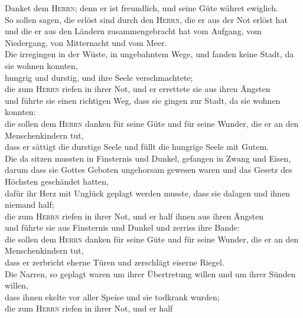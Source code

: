  Danket dem \textsc{Herrn}; denn er ist freundlich, und
seine Güte währet ewiglich.\\
 So sollen sagen, die erlöst sind durch den
\textsc{Herrn}, die er aus der Not erlöst hat\\
 und die er aus den Ländern zusammengebracht hat vom
Aufgang, vom Niedergang, von Mitternacht und vom Meer.\\
 Die irregingen in der Wüste, in ungebahntem Wege, und
fanden keine Stadt, da sie wohnen konnten,\\
 hungrig und durstig, und ihre Seele verschmachtete;\\
 die zum \textsc{Herrn} riefen in ihrer Not, und er
errettete sie aus ihren Ängsten\\
 und führte sie einen richtigen Weg, dass sie gingen zur
Stadt, da sie wohnen konnten:\\
 die sollen dem \textsc{Herrn} danken für seine Güte und
für seine Wunder, die er an den Menschenkindern tut,\\
 dass er sättigt die durstige Seele und füllt die hungrige
Seele mit Gutem.\\
 Die da sitzen mussten in Finsternis und Dunkel, gefangen
in Zwang und Eisen,\\
 darum dass sie Gottes Geboten ungehorsam gewesen waren
und das Gesetz des Höchsten geschändet hatten,\\
 dafür ihr Herz mit Unglück geplagt werden musste, dass
sie dalagen und ihnen niemand half;\\
 die zum \textsc{Herrn} riefen in ihrer Not, und er half
ihnen aus ihren Ängsten\\
 und führte sie aus Finsternis und Dunkel und zerriss
ihre Bande:\\
 die sollen dem \textsc{Herrn} danken für seine Güte und
für seine Wunder, die er an den Menschenkindern tut,\\
 dass er zerbricht eherne Türen und zerschlägt eiserne
Riegel.\\
 Die Narren, so geplagt waren um ihrer Übertretung willen
und um ihrer Sünden willen,\\
 dass ihnen ekelte vor aller Speise und sie todkrank
wurden;\\
 die zum \textsc{Herrn} riefen in ihrer Not, und er half
